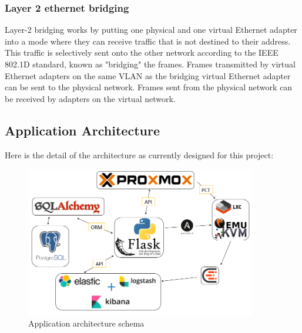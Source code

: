\vspace{1cm}
\subsubsection{Layer 2 ethernet bridging}

Layer-2 bridging works by putting one physical and one virtual Ethernet adapter into a mode where they can receive traffic that is not destined to their address. This traffic is selectively sent onto the other network according to the IEEE 802.1D standard, known as "bridging" the frames. Frames transmitted by virtual Ethernet adapters on the same VLAN as the bridging virtual Ethernet adapter can be sent to the physical network. Frames sent from the physical network can be received by adapters on the virtual network.

\pagebreak

\subsection{Application Architecture}

Here is the detail of the architecture as currently designed for this project:
\vspace{1cm}

\begin{figure}[!h]
  \centering
  \includegraphics[width=0.90\textwidth]{images/schema.png}
  \caption{Application architecture schema}
  \label{ArchitectureSchema}
\end{figure}

